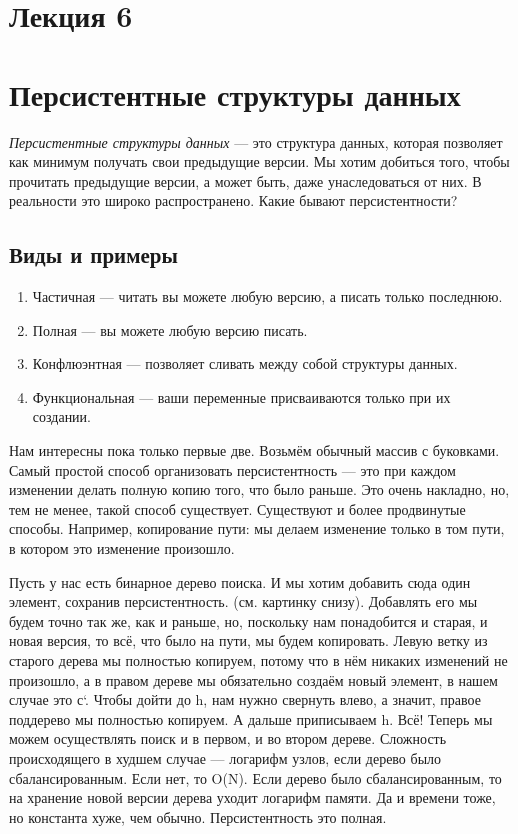 \documentclass[12pt]{article}
\begin{document}
\newpage
\section*{Лекция 6}
\section*{Персистентные структуры данных}
\textit{Персистентные структуры данных} --- это структура данных, которая позволяет как минимум получать свои предыдущие версии. Мы хотим добиться того, чтобы прочитать предыдущие версии, а может быть, даже унаследоваться от них. В реальности это широко распространено. Какие бывают персистентности?

\subsection*{Виды и примеры}
\begin{enumerate}
\item Частичная --- читать вы можете любую версию, а писать только последнюю.
\item Полная --- вы можете любую версию писать.
\item Конфлюэнтная --- позволяет сливать между собой структуры данных.
\item Функциональная --- ваши переменные присваиваются только при их создании.
\end{enumerate}

Нам интересны пока только первые две. Возьмём обычный массив с буковками. Самый простой способ организовать персистентность --- это при каждом изменении делать полную копию того, что было раньше. Это очень накладно, но, тем не менее, такой способ существует. Существуют и более продвинутые способы. Например, копирование пути: мы делаем изменение только в том пути, в котором это изменение произошло.

Пусть у нас есть бинарное дерево поиска. И мы хотим добавить сюда один элемент, сохранив персистентность. (см. картинку снизу). Добавлять его мы будем точно так же, как и раньше, но, поскольку нам понадобится и старая, и новая версия, то всё, что было на пути, мы будем копировать. Левую ветку из старого дерева мы полностью копируем, потому что в нём никаких изменений не произошло, а в правом дереве мы обязательно создаём новый элемент, в нашем случае это с`. Чтобы дойти до h, нам нужно свернуть влево, а значит, правое поддерево мы полностью копируем. А дальше приписываем h. Всё! Теперь мы можем осуществлять поиск и в первом, и во втором дереве. Сложность происходящего в худшем случае --- логарифм узлов, если дерево было сбалансированным. Если нет, то O(N). Если дерево было сбалансированным, то на хранение новой версии дерева уходит логарифм памяти. Да и времени тоже, но константа хуже, чем обычно. Персистентность это полная.
\end{document}
